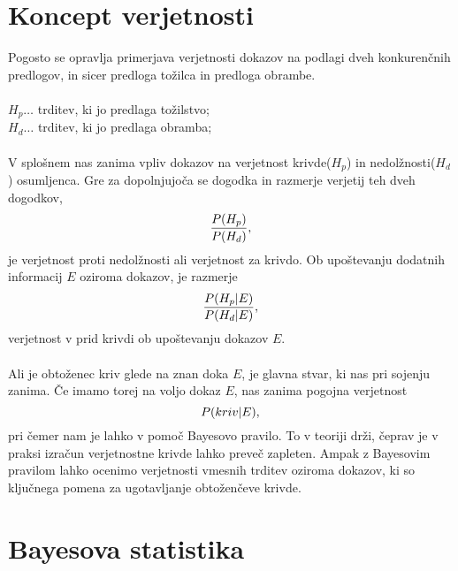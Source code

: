\documentclass[12pt,a4paper]{amsart}
\theoremstyle{definition} %
\theoremstyle{plain} %
\begin{document}
\section{Koncept verjetnosti}
Pogosto se opravlja primerjava verjetnosti dokazov na podlagi dveh konkurenčnih predlogov, in sicer predloga tožilca in predloga obrambe.\\\\
$H_p \dots$ trditev, ki jo predlaga tožilstvo;\\
$H_d \dots$ trditev, ki jo predlaga obramba;\\\\
V splošnem nas zanima vpliv dokazov na verjetnost krivde($H_p$) in nedolžnosti($H_d$) osumljenca. Gre za dopolnjujoča se dogodka in razmerje verjetij 
teh dveh dogodkov,
\begin{equation}
   \frac{P(H_p)}{P(H_d)}, \vspace{2mm}
\end{equation}
je verjetnost proti nedolžnosti ali verjetnost za krivdo. Ob upoštevanju dodatnih informacij $E$ oziroma dokazov, je razmerje
\begin{equation}
   \frac{P(H_p \lvert E)}{P(H_d \lvert E)} \vspace{2mm},
\end{equation}
verjetnost v prid krivdi ob upoštevanju dokazov $E$.\\\\
Ali je obtoženec kriv glede na znan doka $E$, je glavna stvar, ki nas pri sojenju zanima. Če imamo torej na voljo dokaz $E$, nas zanima pogojna 
verjetnost
\[
    P(kriv \lvert E), \vspace{2mm}
\]
pri čemer nam je lahko v pomoč Bayesovo pravilo. To v teoriji drži, čeprav je v praksi izračun verjetnostne krivde lahko preveč zapleten. Ampak 
z Bayesovim pravilom lahko ocenimo verjetnosti vmesnih trditev oziroma dokazov, ki so ključnega pomena za ugotavljanje obtoženčeve krivde.

\section{Bayesova statistika}

\end{document}
